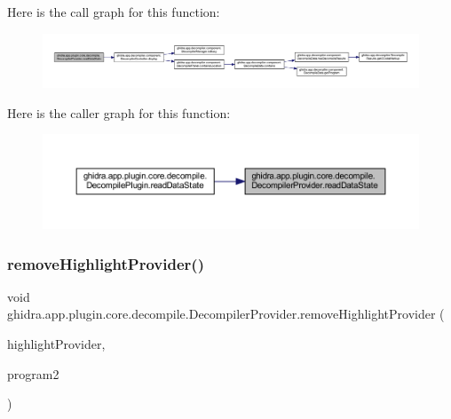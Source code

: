 Here is the call graph for this function\+:
\nopagebreak
\begin{figure}[H]
\begin{center}
\leavevmode
\includegraphics[width=350pt]{classghidra_1_1app_1_1plugin_1_1core_1_1decompile_1_1_decompiler_provider_ade6f2cf204e79466191b7b7045614f94_cgraph}
\end{center}
\end{figure}
Here is the caller graph for this function\+:
\nopagebreak
\begin{figure}[H]
\begin{center}
\leavevmode
\includegraphics[width=350pt]{classghidra_1_1app_1_1plugin_1_1core_1_1decompile_1_1_decompiler_provider_ade6f2cf204e79466191b7b7045614f94_icgraph}
\end{center}
\end{figure}
\mbox{\label{classghidra_1_1app_1_1plugin_1_1core_1_1decompile_1_1_decompiler_provider_a9814a29a4014b8d901dd52f7b70396d3}} 
\subsubsection{\texorpdfstring{removeHighlightProvider()}{removeHighlightProvider()}}
{\footnotesize\ttfamily void ghidra.\+app.\+plugin.\+core.\+decompile.\+Decompiler\+Provider.\+remove\+Highlight\+Provider (\begin{DoxyParamCaption}\item[{Highlight\+Provider}]{highlight\+Provider,  }\item[{Program}]{program2 }\end{DoxyParamCaption})\hspace{0.3cm}{\ttfamily [inline]}}



